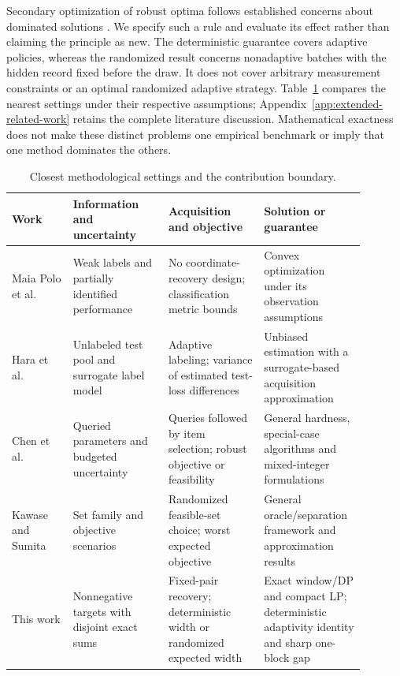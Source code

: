 \documentclass[12pt]{article}
\begin{document}
Secondary optimization of robust optima follows established concerns
about dominated solutions \cite{iancu2014}. We specify such a rule and
evaluate its effect rather than claiming the principle as new. The
deterministic guarantee covers adaptive policies, whereas the randomized
result concerns nonadaptive batches with the hidden record fixed before
the draw. It does not cover arbitrary measurement constraints or an
optimal randomized adaptive strategy. Table~\ref{tab:closest-work}
compares the nearest settings under their respective assumptions;
Appendix~\ref{app:extended-related-work} retains the complete literature
discussion. Mathematical exactness does not make these distinct problems
one empirical benchmark or imply that one method dominates the others.

\begin{table}[htbp]\centering\footnotesize
\caption{Closest methodological settings and the contribution boundary.}
\label{tab:closest-work}
\begin{tabular}{>{\raggedright\arraybackslash}p{0.16\linewidth}>{\raggedright\arraybackslash}p{0.25\linewidth}>{\raggedright\arraybackslash}p{0.25\linewidth}>{\raggedright\arraybackslash}p{0.23\linewidth}}\toprule
Work & Information and uncertainty & Acquisition and objective & Solution or guarantee\\\midrule
Maia Polo et al.~\cite{polo} & Weak labels and partially identified performance & No coordinate-recovery design; classification metric bounds & Convex optimization under its observation assumptions\\
Hara et al.~\cite{hara} & Unlabeled test pool and surrogate label model & Adaptive labeling; variance of estimated test-loss differences & Unbiased estimation with a surrogate-based acquisition approximation\\
Chen et al.~\cite{chen2026} & Queried parameters and budgeted uncertainty & Queries followed by item selection; robust objective or feasibility & General hardness, special-case algorithms and mixed-integer formulations\\
Kawase and Sumita~\cite{kawase2024} & Set family and objective scenarios & Randomized feasible-set choice; worst expected objective & General oracle/separation framework and approximation results\\
This work & Nonnegative targets with disjoint exact sums & Fixed-pair recovery; deterministic width or randomized expected width & Exact window/DP and compact LP; deterministic adaptivity identity and sharp one-block gap\\
\bottomrule\end{tabular}\end{table}
\end{document}
